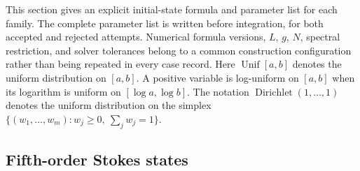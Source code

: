 \documentclass[11pt]{article}
\begin{document}
This section gives an explicit initial-state formula and parameter list for
each family.  The complete parameter list is written before integration, for both
accepted and rejected attempts.  Numerical formula versions, $L$, $g$, $N$,
spectral restriction, and solver tolerances belong to a common construction
configuration rather than being repeated in every case record.
Here $\operatorname{Unif}[a,b]$ denotes the uniform distribution on
$[a,b]$.  A positive variable is log-uniform on $[a,b]$ when its logarithm
is uniform on $[\log a,\log b]$.  The notation
$\operatorname{Dirichlet}(1,\ldots,1)$ denotes the uniform distribution on
the simplex $\{(w_1,\ldots,w_m):w_j\geq0,\ \sum_jw_j=1\}$.

\subsection{Fifth-order Stokes states}
\end{document}
